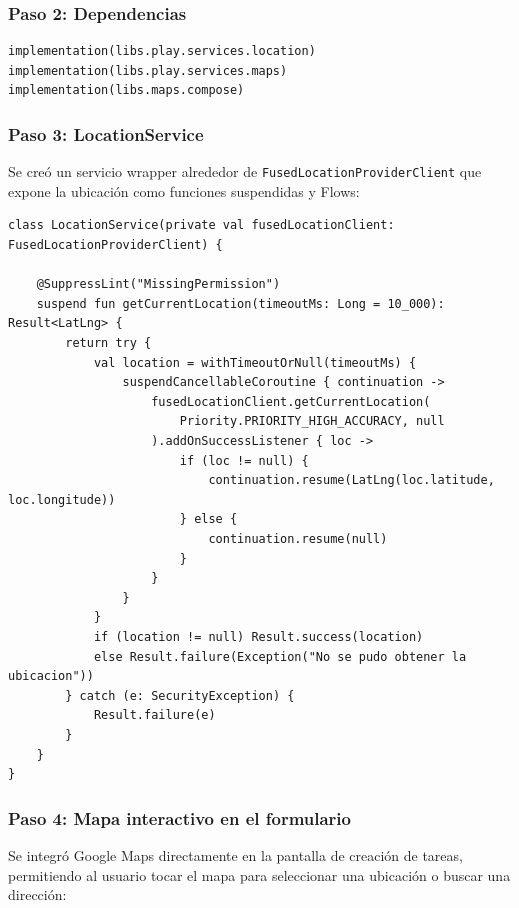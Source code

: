 \documentclass[12pt,a4paper]{article}
\begin{document}
\subsubsection{Paso 2: Dependencias}

\begin{lstlisting}[caption={Dependencias de Google Maps}]
implementation(libs.play.services.location)
implementation(libs.play.services.maps)
implementation(libs.maps.compose)
\end{lstlisting}

\subsubsection{Paso 3: LocationService}

Se creó un servicio wrapper alrededor de \texttt{FusedLocationProviderClient} que expone la ubicación como funciones suspendidas y Flows:

\begin{lstlisting}[caption={LocationService - Obtención de ubicación con timeout}]
class LocationService(private val fusedLocationClient: FusedLocationProviderClient) {

    @SuppressLint("MissingPermission")
    suspend fun getCurrentLocation(timeoutMs: Long = 10_000): Result<LatLng> {
        return try {
            val location = withTimeoutOrNull(timeoutMs) {
                suspendCancellableCoroutine { continuation ->
                    fusedLocationClient.getCurrentLocation(
                        Priority.PRIORITY_HIGH_ACCURACY, null
                    ).addOnSuccessListener { loc ->
                        if (loc != null) {
                            continuation.resume(LatLng(loc.latitude, loc.longitude))
                        } else {
                            continuation.resume(null)
                        }
                    }
                }
            }
            if (location != null) Result.success(location)
            else Result.failure(Exception("No se pudo obtener la ubicacion"))
        } catch (e: SecurityException) {
            Result.failure(e)
        }
    }
}
\end{lstlisting}

\subsubsection{Paso 4: Mapa interactivo en el formulario}

Se integró Google Maps directamente en la pantalla de creación de tareas, permitiendo al usuario tocar el mapa para seleccionar una ubicación o buscar una dirección:
\end{document}
